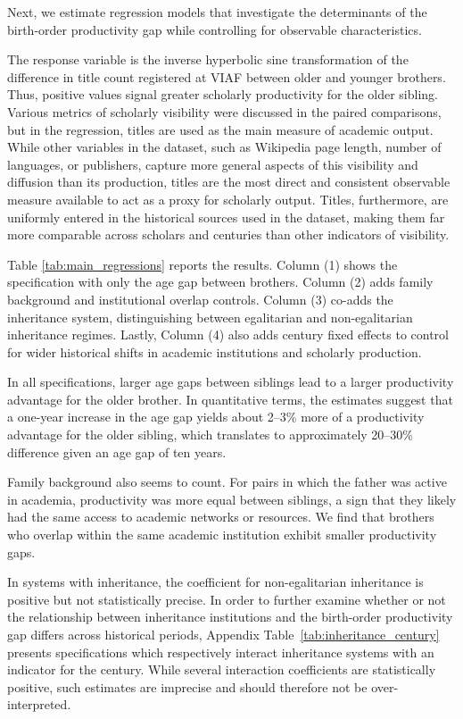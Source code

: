 Next, we estimate regression models that investigate the determinants of the birth-order productivity gap while controlling for observable characteristics.

The response variable is the inverse hyperbolic sine transformation of the difference in title count registered at VIAF between older and younger brothers. Thus, positive values signal greater scholarly productivity for the older sibling. Various metrics of scholarly visibility were discussed in the paired comparisons, but in the regression, titles are used as the main measure of academic output. While other variables in the dataset, such as Wikipedia page length, number of languages, or publishers, capture more general aspects of this visibility and diffusion than its production, titles are the most direct and consistent observable measure available to act as a proxy for scholarly output. Titles, furthermore, are uniformly entered in the historical sources used in the dataset, making them far more comparable across scholars and centuries than other indicators of visibility.

Table \ref{tab:main_regressions} reports the results. Column (1) shows the specification with only the age gap between brothers. Column (2) adds family background and institutional overlap controls. Column (3) co-adds the inheritance system, distinguishing between egalitarian and non-egalitarian inheritance regimes. Lastly, Column (4) also adds century fixed effects to control for wider historical shifts in academic institutions and scholarly production.

In all specifications, larger age gaps between siblings lead to a larger productivity advantage for the older brother. In quantitative terms, the estimates suggest that a one-year increase in the age gap yields about 2–3\% more of a productivity advantage for the older sibling, which translates to approximately 20–30\% difference given an age gap of ten years.

Family background also seems to count. For pairs in which the father was active in academia, productivity was more equal between siblings, a sign that they likely had the same access to academic networks or resources. We find that brothers who overlap within the same academic institution exhibit smaller productivity gaps.

In systems with inheritance, the coefficient for non-egalitarian inheritance is positive but not statistically precise. In order to further examine whether or not the relationship between inheritance institutions and the birth-order productivity gap differs across historical periods, Appendix Table~\ref{tab:inheritance_century} presents specifications which respectively interact inheritance systems with an indicator for the century. While several interaction coefficients are statistically positive, such estimates are imprecise and should therefore not be over-interpreted.

